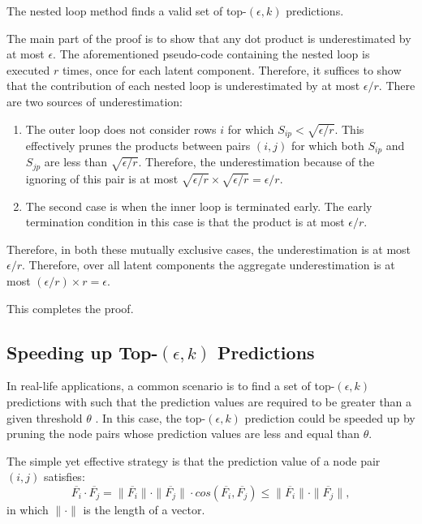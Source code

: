 \begin{prop}
\label{prop-valid-topk}
The nested loop method finds a valid set of top-$(\epsilon, k)$
predictions.
\end{prop}
\begin{IEEEproof}
The main part of the proof is to show that any dot product is
underestimated by at most  $\epsilon$. The aforementioned pseudo-code
containing the  nested loop is executed $r$ times, once for each
latent component. Therefore, it suffices to show that the
contribution of each nested loop is underestimated by at most
$\epsilon/r$. There are two sources of underestimation:
\begin{enumerate}
\item  The outer loop does not consider rows $i$ for which $S_{ip} <
\sqrt{\epsilon/r}$. This effectively prunes the products between
pairs $(i, j)$ for which both $S_{ip}$ and $S_{jp}$ are less
than $\sqrt{\epsilon/r}$. Therefore, the underestimation because of
the ignoring of this pair is at most $\sqrt{\epsilon/r} \times
\sqrt{\epsilon/r} = \epsilon/r$.
\item The second case is when the inner loop is terminated early.
The early termination condition in this case is that the product is
at most $\epsilon/r$.
\end{enumerate}
Therefore, in both these mutually exclusive cases, the
underestimation is at most $\epsilon/r$. Therefore, over all latent
components the aggregate underestimation is at most
$(\epsilon/r)\times r= \epsilon$.

This completes the proof.
\end{IEEEproof}

\subsection{Speeding up Top-$(\epsilon, k)$ Predictions}
\label{sec-NMF-topk-optimization}


 In real-life applications,
a common scenario is to find a set of top-$(\epsilon, k)$ predictions with such that the prediction
values are required to be greater than a given threshold $\theta$ \cite{ballard2015, lemp}. In this case,
the top-$(\epsilon, k)$ prediction could be speeded up by pruning the node pairs whose prediction values are less and equal than $\theta$.

The simple yet effective strategy is that the prediction value of a node pair $(i, j)$ satisfies:
\begin{equation}
\label{equation-length}
\overline{F_i} \cdot \overline{F_j} = \|\overline{F_i} \| \cdot \| \overline{F_j} \| \cdot
cos(\overline{F_i}, \overline{F_j}) \leq \|\overline{F_i} \| \cdot \| \overline{F_j} \|,
\end{equation} in which $\|\cdot\|$ is the length of a vector. 

